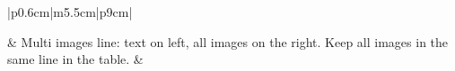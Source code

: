\begin{longtable}{|p{0.6cm}|m{5.5cm}|p{9cm}|}
    \\ \hline          
    

    \centering \steplist
    &
    Multi images line: text on left, all images on the right. Keep all images in the same line in the table.
    &
    \begin{minipage}[b]{\linewidth}
        \centering
    \end{minipage}\\ \hline
    


\end{longtable}

